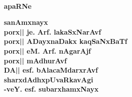 
~
\medskip

\vfill

\begin{center}
{\Large\bfseries apaRNe}
\end{center}
\bigskip

\begin{center}
{\bf sanAmxnayx\\
porx|| je. Arf. lakaSxNarAvf\\[4pt]
porx|| ADayxnaDakx kaqSaNxBaTf\\[4pt]
porx|| eM. Arf. nAgarAjf\\[4pt]
porx|| mAdhurAvf\\[4pt]
DA|| esf. bAlacaMdarxrAvf\\[0.6cm]
sharxdAdhxpUvaRkavAgi\\
\hfill{-veY. esf. subarxhamxNayx}}                                                   
\end{center}

\vfill
\eject
